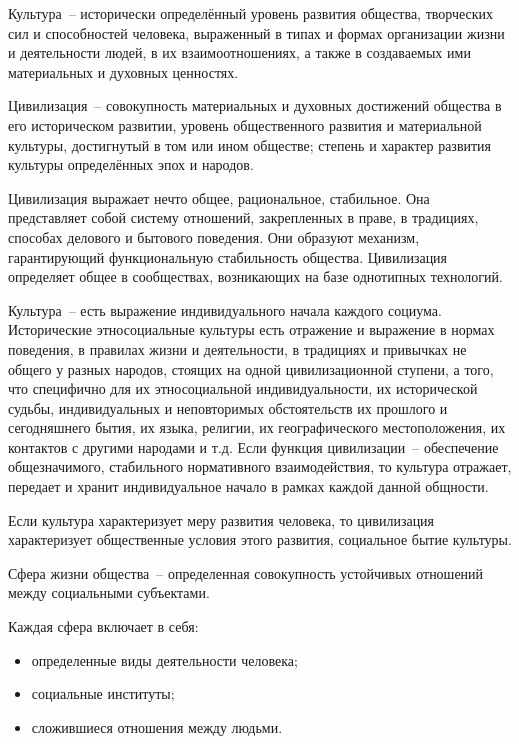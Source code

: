 
Культура~-- исторически определённый уровень развития общества, творческих сил и способностей
человека, выраженный в типах и формах организации жизни и деятельности людей, в их взаимоотношениях,
а также в создаваемых ими материальных и духовных ценностях.

Цивилизация~-- совокупность материальных и духовных достижений общества в его историческом развитии,
уровень общественного развития и материальной культуры, достигнутый в том или ином обществе; степень
и характер развития культуры определённых эпох и народов.

Цивилизация выражает нечто общее, рациональное, стабильное. Она представляет собой систему отношений,
закрепленных в праве, в традициях, способах делового и бытового поведения. Они образуют механизм,
гарантирующий функциональную стабильность общества. Цивилизация определяет общее в сообществах,
возникающих на базе однотипных технологий.

Культура~-- есть выражение индивидуального начала каждого социума. Исторические этносоциальные
культуры есть отражение и выражение в нормах поведения, в правилах жизни и деятельности, в традициях
и привычках не общего у разных народов, стоящих на одной цивилизационной ступени, а того, что
специфично для их этносоциальной индивидуальности, их исторической судьбы, индивидуальных и
неповторимых обстоятельств их прошлого и сегодняшнего бытия, их языка, религии, их географического
местоположения, их контактов с другими народами и т.д. Если функция цивилизации~-- обеспечение
общезначимого, стабильного нормативного взаимодействия, то культура отражает, передает и хранит
индивидуальное начало в рамках каждой данной общности.

Если культура характеризует меру развития человека, то цивилизация характеризует общественные условия
этого развития, социальное бытие культуры. 

Сфера жизни общества~-- определенная совокупность устойчивых отношений между социальными субъектами.

Каждая сфера включает в себя:
\begin{itemize}
    \item определенные виды деятельности человека;
    \item социальные институты;
    \item сложившиеся отношения между людьми.
\end{itemize}

